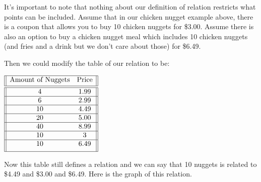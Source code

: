 \documentclass[nooutcomes]{ximera}
\begin{document}
\begin{example}
It's important to note that nothing about our definition of relation restricts what points can be included.  Assume that in our chicken nugget example above, there is a coupon that allows you to buy 10 chicken nuggets for \$3.00.  Assume there is also an option to buy a chicken nugget meal which includes 10 chicken nuggets (and fries and a drink but we don't care about those) for \$6.49.  

\begin{explanation}
Then we could modify the table of our relation to be:
\begin{center}
$
 \begin{array}{||c c||} 
 \hline
 \text{Amount of Nuggets} & \text{Price} \\ [0.5ex] 
 \hline\hline
 4 & 1.99\\ 
 \hline
 6 & 2.99 \\
 \hline
 10 & 4.49\\
 \hline
 20 & 5.00 \\
 \hline
 40 & 8.99\\ 
 \hline
 10 & 3 \\
 \hline
 10 & 6.49\\ [1ex] 
 \hline
\end{array}
$
\end{center}


Now this table still defines a relation and we can say that 10 nuggets is related to \$4.49 and \$3.00 and \$6.49. Here is the graph of this relation.

\begin{image}
\end{image}
\end{explanation}
\end{example}
\end{document}
